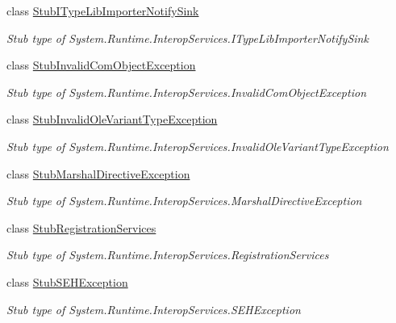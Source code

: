 \begin{DoxyCompactItemize}
class \hyperlink{class_system_1_1_runtime_1_1_interop_services_1_1_fakes_1_1_stub_i_type_lib_importer_notify_sink}{Stub\-I\-Type\-Lib\-Importer\-Notify\-Sink}
\begin{DoxyCompactList}\small\item\em Stub type of System.\-Runtime.\-Interop\-Services.\-I\-Type\-Lib\-Importer\-Notify\-Sink\end{DoxyCompactList}\item 
class \hyperlink{class_system_1_1_runtime_1_1_interop_services_1_1_fakes_1_1_stub_invalid_com_object_exception}{Stub\-Invalid\-Com\-Object\-Exception}
\begin{DoxyCompactList}\small\item\em Stub type of System.\-Runtime.\-Interop\-Services.\-Invalid\-Com\-Object\-Exception\end{DoxyCompactList}\item 
class \hyperlink{class_system_1_1_runtime_1_1_interop_services_1_1_fakes_1_1_stub_invalid_ole_variant_type_exception}{Stub\-Invalid\-Ole\-Variant\-Type\-Exception}
\begin{DoxyCompactList}\small\item\em Stub type of System.\-Runtime.\-Interop\-Services.\-Invalid\-Ole\-Variant\-Type\-Exception\end{DoxyCompactList}\item 
class \hyperlink{class_system_1_1_runtime_1_1_interop_services_1_1_fakes_1_1_stub_marshal_directive_exception}{Stub\-Marshal\-Directive\-Exception}
\begin{DoxyCompactList}\small\item\em Stub type of System.\-Runtime.\-Interop\-Services.\-Marshal\-Directive\-Exception\end{DoxyCompactList}\item 
class \hyperlink{class_system_1_1_runtime_1_1_interop_services_1_1_fakes_1_1_stub_registration_services}{Stub\-Registration\-Services}
\begin{DoxyCompactList}\small\item\em Stub type of System.\-Runtime.\-Interop\-Services.\-Registration\-Services\end{DoxyCompactList}\item 
class \hyperlink{class_system_1_1_runtime_1_1_interop_services_1_1_fakes_1_1_stub_s_e_h_exception}{Stub\-S\-E\-H\-Exception}
\begin{DoxyCompactList}\small\item\em Stub type of System.\-Runtime.\-Interop\-Services.\-S\-E\-H\-Exception\end{DoxyCompactList}\item 

\end{DoxyCompactItemize}
